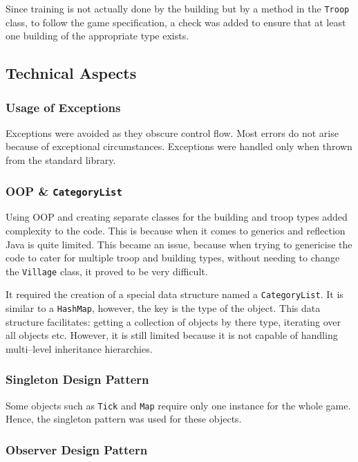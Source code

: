 \documentclass[12pt]{article}
\begin{document}
Since training is not actually done by the building but by a
method in the \texttt{Troop} class, to follow the game
specification, a check was added to ensure that at least one
building of the appropriate type exists. 

\subsection{Technical Aspects}

\subsubsection{Usage of Exceptions}

Exceptions were avoided as they obscure control flow. Most
errors do not arise because of exceptional circumstances.
Exceptions were handled only when thrown from the standard
library.

\subsubsection{OOP \& \texttt{CategoryList}}

Using OOP and creating separate classes for the building and
troop types added complexity to the code. This is because when
it comes to generics and reflection Java is quite limited. This
became an issue, because when trying to genericise the code to
cater for multiple troop and building types, without needing to
change the \texttt{Village} class, it proved to be very difficult.

It required the creation of a special data structure named a
\texttt{CategoryList}. It is similar to a \texttt{HashMap},
however, the key is the type of the object. This data structure
facilitates: getting a collection of objects by there type,
iterating over all objects etc. However, it is still limited
because it is not capable of handling multi--level inheritance
hierarchies.

\subsubsection{Singleton Design Pattern}

Some objects such as \texttt{Tick} and \texttt{Map} require only
one instance for the whole game. Hence, the singleton pattern
was used for these objects.

\subsubsection{Observer Design Pattern}
\end{document}
